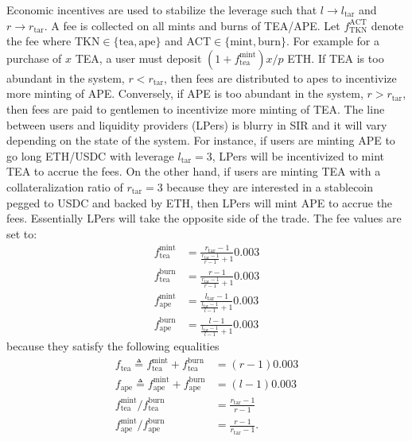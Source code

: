 \documentclass[journal,letterpaper,oneside,onecolumn,12pt]{IEEEtran}
\begin{document}
	Economic incentives are used to stabilize the leverage such that $l\rightarrow l_\textrm{tar}$ and $r\rightarrow r_\textrm{tar}$.
	A fee is collected on all mints and burns of TEA/APE. Let $f_\textrm{TKN}^\textrm{ACT}$ denote the fee where $\textrm{TKN}\in\{\textrm{tea},\textrm{ape}\}$ and $\textrm{ACT}\in\{\textrm{mint},\textrm{burn}\}$. For example for a purchase of $x$ TEA, a user must deposit $(1+f_\textrm{tea}^\textrm{mint})x/p$ ETH. If TEA is too abundant in the system, $r<r_\textrm{tar}$, then fees are distributed to apes to incentivize more minting of APE. Conversely, if APE is too abundant in the system, $r>r_\textrm{tar}$, then fees are paid to gentlemen to incentivize more minting of TEA. The line between users and liquidity providers (LPers) is blurry in SIR and it will vary depending on the state of the system. For instance, if users are minting APE to go long ETH/USDC with leverage $l_\textrm{tar}=3$, LPers will be incentivized to mint TEA to accrue the fees. On the other hand, if users are minting TEA with a collateralization ratio of $r_\textrm{tar}=3$ because they are interested in a stablecoin pegged to USDC and backed by ETH, then LPers will mint APE to accrue the fees. Essentially LPers will take the opposite side of the trade.
	The fee values are set to:
	\begin{align}
		f_\textrm{tea}^\textrm{mint} &= \frac{r_\textrm{tar}-1}{\frac{r_\textrm{tar}-1}{r-1}+1} 0.003 \label{eq:fee:tea_mint} \\
		f_\textrm{tea}^\textrm{burn} &= \frac{r-1}{\frac{r_\textrm{tar}-1}{r-1}+1} 0.003 \\
		f_\textrm{ape}^\textrm{mint} &= \frac{l_\textrm{tar}-1}{\frac{l_\textrm{tar}-1}{l-1}+1} 0.003 \\
		f_\textrm{ape}^\textrm{burn} &= \frac{l-1}{\frac{l_\textrm{tar}-1}{l-1}+1} 0.003 \label{eq:fee:ape_burn}
	\end{align}
	because they satisfy the following equalities
	\begin{align}
		f_\textrm{tea} \triangleq f_\textrm{tea}^\textrm{mint} +f_\textrm{tea}^\textrm{burn} &= (r-1)0.003 \label{eq:fee:tea} \\
		f_\textrm{ape} \triangleq f_\textrm{ape}^\textrm{mint} +f_\textrm{ape}^\textrm{burn} &= (l-1)0.003 \label{eq:fee:ape} \\
		f_\textrm{tea}^\textrm{mint}/f_\textrm{tea}^\textrm{burn} &= \frac{r_\textrm{tar}-1}{r-1} \label{eq:fee_ratio:tea} \\
		f_\textrm{ape}^\textrm{mint}/f_\textrm{ape}^\textrm{burn} &= \frac{r-1}{r_\textrm{tar}-1}. \label{eq:fee_ratio:ape}
	\end{align}
\end{document}
